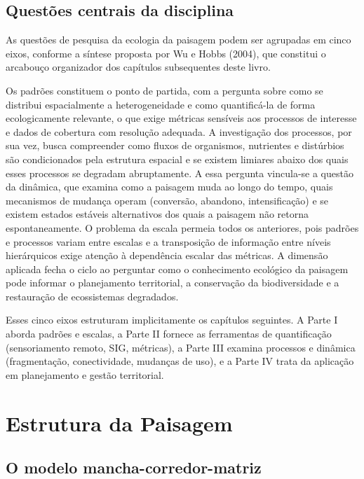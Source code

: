 \documentclass[
  portuguese,
  11pt,
  a4paper,
  open=any]{scrbook}
\begin{document}
\section{Questões centrais da
disciplina}\label{questuxf5es-centrais-da-disciplina}

As questões de pesquisa da ecologia da paisagem podem ser agrupadas em
cinco eixos, conforme a síntese proposta por Wu e Hobbs (2004), que
constitui o arcabouço organizador dos capítulos subsequentes deste
livro.

Os padrões constituem o ponto de partida, com a pergunta sobre como se
distribui espacialmente a heterogeneidade e como quantificá-la de forma
ecologicamente relevante, o que exige métricas sensíveis aos processos
de interesse e dados de cobertura com resolução adequada. A investigação
dos processos, por sua vez, busca compreender como fluxos de organismos,
nutrientes e distúrbios são condicionados pela estrutura espacial e se
existem limiares abaixo dos quais esses processos se degradam
abruptamente. A essa pergunta vincula-se a questão da dinâmica, que
examina como a paisagem muda ao longo do tempo, quais mecanismos de
mudança operam (conversão, abandono, intensificação) e se existem
estados estáveis alternativos dos quais a paisagem não retorna
espontaneamente. O problema da escala permeia todos os anteriores, pois
padrões e processos variam entre escalas e a transposição de informação
entre níveis hierárquicos exige atenção à dependência escalar das
métricas. A dimensão aplicada fecha o ciclo ao perguntar como o
conhecimento ecológico da paisagem pode informar o planejamento
territorial, a conservação da biodiversidade e a restauração de
ecossistemas degradados.

Esses cinco eixos estruturam implicitamente os capítulos seguintes. A
Parte I aborda padrões e escalas, a Parte II fornece as ferramentas de
quantificação (sensoriamento remoto, SIG, métricas), a Parte III examina
processos e dinâmica (fragmentação, conectividade, mudanças de uso), e a
Parte IV trata da aplicação em planejamento e gestão territorial.

\chapter{Estrutura da Paisagem}\label{sec-estrutura-paisagem}

\section{O modelo
mancha-corredor-matriz}\label{o-modelo-mancha-corredor-matriz}
\end{document}
